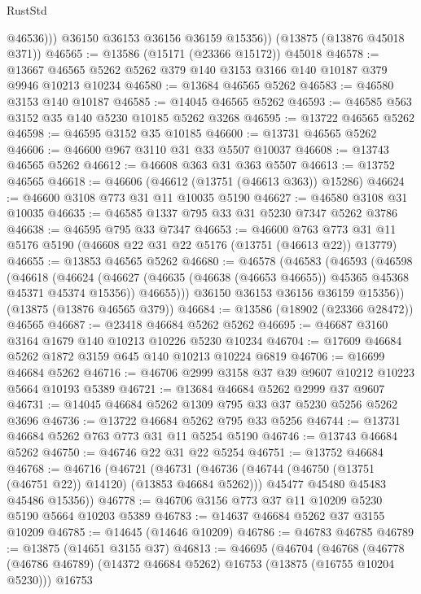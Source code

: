 \begin{lexlean}{RustStd}
\begin{coremodule}
              @46536)))
        @36150
        @36153
        @36156
        @36159
        @15356))
    (@13875 (@13876 @45018 @371))
@46565 := @13586 (@15171 (@23366 @15172)) @45018
@46578 := @13667 @46565 @5262 @5262 @379 @140 @3153 @3166 @140 @10187 @379 @9946 @10213 @10234
@46580 := @13684 @46565 @5262
@46583 := @46580 @3153 @140 @10187
@46585 := @14045 @46565 @5262
@46593 := @46585 @563 @3152 @35 @140 @5230 @10185 @5262 @3268
@46595 := @13722 @46565 @5262
@46598 := @46595 @3152 @35 @10185
@46600 := @13731 @46565 @5262
@46606 := @46600 @967 @3110 @31 @33 @5507 @10037
@46608 := @13743 @46565 @5262
@46612 := @46608 @363 @31 @363 @5507
@46613 := @13752 @46565
@46618 := @46606 (@46612 (@13751 (@46613 @363)) @15286)
@46624 := @46600 @3108 @773 @31 @11 @10035 @5190
@46627 := @46580 @3108 @31 @10035
@46635 := @46585 @1337 @795 @33 @31 @5230 @7347 @5262 @3786
@46638 := @46595 @795 @33 @7347
@46653 := @46600
    @763
    @773
    @31
    @11
    @5176
    @5190
    (@46608 @22 @31 @22 @5176 (@13751 (@46613 @22)) @13779)
@46655 := @13853 @46565 @5262
@46680 := @46578
    (@46583
      (@46593
        (@46598
          (@46618
            (@46624
              (@46627 (@46635 (@46638 (@46653 @46655)) @45365 @45368 @45371 @45374 @15356))
              @46655)))
        @36150
        @36153
        @36156
        @36159
        @15356))
    (@13875 (@13876 @46565 @379))
@46684 := @13586 (@18902 (@23366 @28472)) @46565
@46687 := @23418 @46684 @5262 @5262
@46695 := @46687 @3160 @3164 @1679 @140 @10213 @10226 @5230 @10234
@46704 := @17609 @46684 @5262 @1872 @3159 @645 @140 @10213 @10224 @6819
@46706 := @16699 @46684 @5262
@46716 := @46706 @2999 @3158 @37 @39 @9607 @10212 @10223 @5664 @10193 @5389
@46721 := @13684 @46684 @5262 @2999 @37 @9607
@46731 := @14045 @46684 @5262 @1309 @795 @33 @37 @5230 @5256 @5262 @3696
@46736 := @13722 @46684 @5262 @795 @33 @5256
@46744 := @13731 @46684 @5262 @763 @773 @31 @11 @5254 @5190
@46746 := @13743 @46684 @5262
@46750 := @46746 @22 @31 @22 @5254
@46751 := @13752 @46684
@46768 := @46716
    (@46721
      (@46731
        (@46736 (@46744 (@46750 (@13751 (@46751 @22)) @14120) (@13853 @46684 @5262)))
        @45477
        @45480
        @45483
        @45486
        @15356))
@46778 := @46706 @3156 @773 @37 @11 @10209 @5230 @5190 @5664 @10203 @5389
@46783 := @14637 @46684 @5262 @37 @3155 @10209
@46785 := @14645 (@14646 @10209)
@46786 := @46783 @46785
@46789 := @13875 (@14651 @3155 @37)
@46813 := @46695
    (@46704
      (@46768
        (@46778 (@46786 @46789) (@14372 @46684 @5262) @16753 (@13875 (@16755 @10204 @5230)))
        @16753

\end{coremodule}
\end{lexlean}
